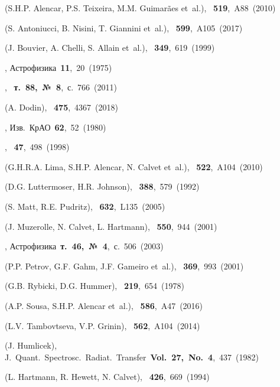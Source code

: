 \documentclass{article}
\def\etal{{et~al.}}
\def\etal{{et~al.}}
\begin{document}
\begin{references}

 (S.H.P. Alencar, P.S. Teixeira, M.M. Guimarães \etal), \aap~{\bf 519},~A88~(2010)

 (S. Antoniucci, B. Nisini, T. Giannini \etal), \aap~{\bf 599},~A105~(2017)

 (J. Bouvier, A. Chelli, S. Allain \etal), \aap~{\bf 349},~619~(1999)

, Астрофизика~{\bf 11},~20~(1975)

, \azh~{\bf т.~88,~№~8},~с.~766~(2011)

 (A. Dodin), \mnras~{\bf 475},~4367~(2018)

, Изв.~КрАО~{\bf 62},~52~(1980)

, \azh~{\bf 47},~498~(1998)

 (G.H.R.A. Lima, S.H.P. Alencar, N. Calvet \etal), \aap~{\bf 522},~A104~(2010)

 (D.G. Luttermoser, H.R. Johnson), \apj~{\bf 388},~579~(1992)

 (S. Matt, R.E. Pudritz), \apjl~{\bf 632},~L135~(2005)

 (J. Muzerolle, N. Calvet, L. Hartmann), \apj~{\bf 550},~944~(2001)

, Астрофизика~{\bf т.~46,~№~4},~с.~506~(2003)

 (P.P. Petrov, G.F. Gahm, J.F. Gameiro \etal), \aap~{\bf 369},~993~(2001)  

 (G.B. Rybicki, D.G. Hummer), \apj~{\bf 219},~654~(1978)

 (A.P. Sousa, S.H.P. Alencar \etal), \aap~{\bf 586},~A47~(2016) 

 (L.V. Tambovtseva, V.P. Grinin), \aap~{\bf 562},~A104~(2014)

 (J. Humlicek), J.~Quant.~Spectrosc.~Radiat.~Transfer~{\bf Vol.~27,~No.~4},~437~(1982)  

 (L. Hartmann, R. Hewett, N. Calvet), \apj~{\bf 426},~669~(1994)



\end{references}



\end{document}
